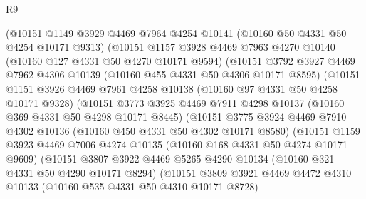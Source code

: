 \begin{lexlean}{R9}
\begin{coremodule}
                (@10151
                  @1149
                  @3929
                  @4469
                  @7964
                  @4254
                  @10141
                  (@10160 @50 @4331 @50 @4254 @10171 @9313)
                  (@10151
                    @1157
                    @3928
                    @4469
                    @7963
                    @4270
                    @10140
                    (@10160 @127 @4331 @50 @4270 @10171 @9594)
                    (@10151
                      @3792
                      @3927
                      @4469
                      @7962
                      @4306
                      @10139
                      (@10160 @455 @4331 @50 @4306 @10171 @8595)
                      (@10151
                        @1151
                        @3926
                        @4469
                        @7961
                        @4258
                        @10138
                        (@10160 @97 @4331 @50 @4258 @10171 @9328)
                        (@10151
                          @3773
                          @3925
                          @4469
                          @7911
                          @4298
                          @10137
                          (@10160 @369 @4331 @50 @4298 @10171 @8445)
                          (@10151
                            @3775
                            @3924
                            @4469
                            @7910
                            @4302
                            @10136
                            (@10160 @450 @4331 @50 @4302 @10171 @8580)
                            (@10151
                              @1159
                              @3923
                              @4469
                              @7006
                              @4274
                              @10135
                              (@10160 @168 @4331 @50 @4274 @10171 @9609)
                              (@10151
                                @3807
                                @3922
                                @4469
                                @5265
                                @4290
                                @10134
                                (@10160 @321 @4331 @50 @4290 @10171 @8294)
                                (@10151
                                  @3809
                                  @3921
                                  @4469
                                  @4472
                                  @4310
                                  @10133
                                  (@10160 @535 @4331 @50 @4310 @10171 @8728)

\end{coremodule}
\end{lexlean}
